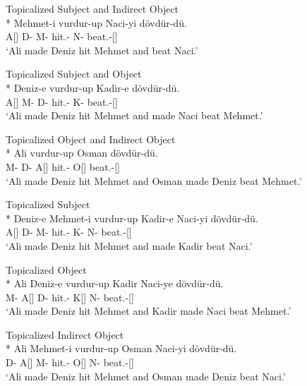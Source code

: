 \begin{exe}
\ex \label{ipextensive}
\begin{xlist}
\ex Topicalized Subject and Indirect Object\\*
 Mehmet-i vurdur-up Naci-yi dövdür-dü. \\ 
A[{\Nom}] D-{\Dat} M-{\Acc} hit.{\Caus}-{\Pc} N-{\Acc} beat.{\Caus}-{\Pst}[{\Tsg}] \\
\glt `Ali made Deniz hit Mehmet and beat Naci.'

\ex Topicalized Subject and Object\\*
 Deniz-e vurdur-up Kadir-e dövdür-dü. \\ 
A[{\Nom}] M-{\Acc} D-{\Dat} hit.{\Caus}-{\Pc} K-{\Dat} beat.{\Caus}-{\Pst}[{\Tsg}] \\
\glt `Ali made Deniz hit Mehmet and made Naci beat Mehmet.'

\ex Topicalized Object and Indirect Object\\*
 Ali vurdur-up Osman dövdür-dü. \\ 
M-{\Acc} D-{\Dat} A[{\Nom}] hit.{\Caus}-{\Pc} O[{\Nom}] beat.{\Caus}-{\Pst}[{\Tsg}] \\
\glt `Ali made Deniz hit Mehmet and Osman made Deniz beat Mehmet.'

\ex Topicalized Subject \label{iptops}\\*
\gll [Ali] Deniz-e Mehmet-i vurdur-up Kadir-e Naci-yi dövdür-dü. \\ 
A[{\Nom}] D-{\Dat} M-{\Acc} hit.{\Caus}-{\Pc} K-{\Dat} N-{\Acc} beat.{\Caus}-{\Pst}[{\Tsg}] \\
\glt `Ali made Deniz hit Mehmet and made Kadir beat Naci.'

\ex Topicalized Object\\*
\gll [Mehmet-i] Ali Deniz-e vurdur-up Kadir Naci-ye dövdür-dü. \\ 
M-{\Acc} A[{\Nom}] D-{\Dat} hit.{\Caus}-{\Pc} K[{\Nom}] N-{\Dat} beat.{\Caus}-{\Pst}[{\Tsg}] \\
\glt `Ali made Deniz hit Mehmet and Kadir made Naci beat Mehmet.' 

\ex Topicalized Indirect Object\\*
\gll [Deniz-e] Ali Mehmet-i vurdur-up Osman Naci-yi dövdür-dü. \\ 
D-{\Dat} A[{\Nom}] M-{\Acc} hit.{\Caus}-{\Pc} O[{\Nom}] N-{\Acc} beat.{\Caus}-{\Pst}[{\Tsg}] \\
\glt`Ali made Deniz hit Mehmet and Osman made Deniz beat Naci.'
\end{xlist}
\end{exe}

